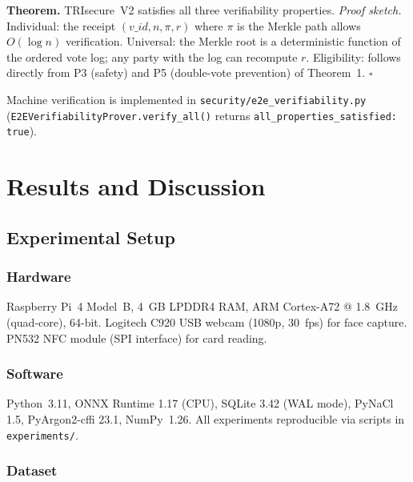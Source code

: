 \documentclass[pdflatex,sn-mathphys-num]{sn-jnl}%
\theoremstyle{thmstyleone}%
\theoremstyle{thmstyletwo}%
\theoremstyle{thmstylethree}%
\begin{document}
\textbf{Theorem.} TRIsecure~V2 satisfies all three verifiability properties.
\textit{Proof sketch.} Individual: the receipt $(v\_id, n, \pi, r)$ where $\pi$
is the Merkle path allows $O(\log n)$ verification. Universal: the Merkle root
is a deterministic function of the ordered vote log; any party with the log can
recompute $r$. Eligibility: follows directly from P3 (safety) and P5
(double-vote prevention) of Theorem~1. $\square$

Machine verification is implemented in \texttt{security/e2e\_verifiability.py}
(\texttt{E2EVerifiabilityProver.verify\_all()} returns
\texttt{all\_properties\_satisfied: true}).

\section{Results and Discussion}\label{sec:evaluation}

\subsection{Experimental Setup}

\subsubsection{Hardware}

Raspberry Pi~4 Model~B, 4~GB LPDDR4 RAM, ARM Cortex-A72 @ 1.8~GHz
(quad-core), 64-bit. Logitech C920 USB webcam (1080p, 30~fps) for face
capture. PN532 NFC module (SPI interface) for card reading.

\subsubsection{Software}

Python~3.11, ONNX Runtime 1.17 (CPU), SQLite 3.42 (WAL mode), PyNaCl 1.5,
PyArgon2-cffi 23.1, NumPy~1.26. All experiments reproducible via scripts in
\texttt{experiments/}.

\subsubsection{Dataset}
\end{document}
